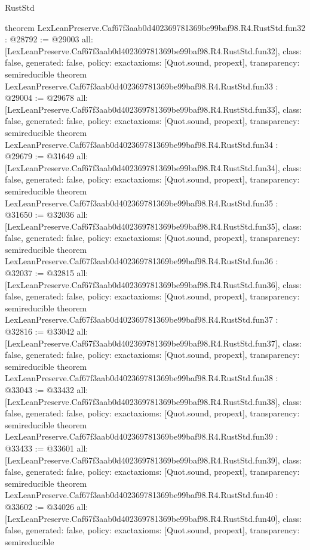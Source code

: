 \begin{lexlean}{RustStd}
\begin{coremodule}
{}
theorem LexLeanPreserve.Caf67f3aab0d402369781369be99baf98.R4.RustStd.fun32 : @28792 := @29003 {
  all: [LexLeanPreserve.Caf67f3aab0d402369781369be99baf98.R4.RustStd.fun32],
  class: false,
  generated: false,
  policy: exact{axioms: [Quot.sound, propext]},
  transparency: semireducible
}
theorem LexLeanPreserve.Caf67f3aab0d402369781369be99baf98.R4.RustStd.fun33 : @29004 := @29678 {
  all: [LexLeanPreserve.Caf67f3aab0d402369781369be99baf98.R4.RustStd.fun33],
  class: false,
  generated: false,
  policy: exact{axioms: [Quot.sound, propext]},
  transparency: semireducible
}
theorem LexLeanPreserve.Caf67f3aab0d402369781369be99baf98.R4.RustStd.fun34 : @29679 := @31649 {
  all: [LexLeanPreserve.Caf67f3aab0d402369781369be99baf98.R4.RustStd.fun34],
  class: false,
  generated: false,
  policy: exact{axioms: [Quot.sound, propext]},
  transparency: semireducible
}
theorem LexLeanPreserve.Caf67f3aab0d402369781369be99baf98.R4.RustStd.fun35 : @31650 := @32036 {
  all: [LexLeanPreserve.Caf67f3aab0d402369781369be99baf98.R4.RustStd.fun35],
  class: false,
  generated: false,
  policy: exact{axioms: [Quot.sound, propext]},
  transparency: semireducible
}
theorem LexLeanPreserve.Caf67f3aab0d402369781369be99baf98.R4.RustStd.fun36 : @32037 := @32815 {
  all: [LexLeanPreserve.Caf67f3aab0d402369781369be99baf98.R4.RustStd.fun36],
  class: false,
  generated: false,
  policy: exact{axioms: [Quot.sound, propext]},
  transparency: semireducible
}
theorem LexLeanPreserve.Caf67f3aab0d402369781369be99baf98.R4.RustStd.fun37 : @32816 := @33042 {
  all: [LexLeanPreserve.Caf67f3aab0d402369781369be99baf98.R4.RustStd.fun37],
  class: false,
  generated: false,
  policy: exact{axioms: [Quot.sound, propext]},
  transparency: semireducible
}
theorem LexLeanPreserve.Caf67f3aab0d402369781369be99baf98.R4.RustStd.fun38 : @33043 := @33432 {
  all: [LexLeanPreserve.Caf67f3aab0d402369781369be99baf98.R4.RustStd.fun38],
  class: false,
  generated: false,
  policy: exact{axioms: [Quot.sound, propext]},
  transparency: semireducible
}
theorem LexLeanPreserve.Caf67f3aab0d402369781369be99baf98.R4.RustStd.fun39 : @33433 := @33601 {
  all: [LexLeanPreserve.Caf67f3aab0d402369781369be99baf98.R4.RustStd.fun39],
  class: false,
  generated: false,
  policy: exact{axioms: [Quot.sound, propext]},
  transparency: semireducible
}
theorem LexLeanPreserve.Caf67f3aab0d402369781369be99baf98.R4.RustStd.fun40 : @33602 := @34026 {
  all: [LexLeanPreserve.Caf67f3aab0d402369781369be99baf98.R4.RustStd.fun40],
  class: false,
  generated: false,
  policy: exact{axioms: [Quot.sound, propext]},
  transparency: semireducible
}
\end{coremodule}
\end{lexlean}
